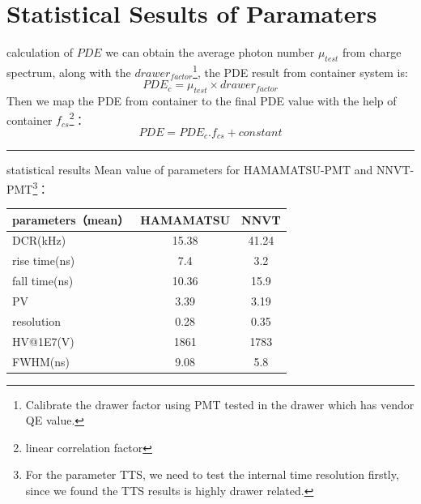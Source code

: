 \documentclass[11pt,compress,xcolor=x11names,UTF8]{beamer}
\begin{document}
\section{Statistical Sesults of Paramaters}
\begin{frame}{calculation of $PDE$}
we can obtain the average photon number $\mu_{test}$ from charge spectrum, along with the $drawer_{factor}$\footnote{Calibrate the drawer factor using PMT tested in the drawer which has vendor QE value.}, the PDE result from container system is:
\begin{equation}
PDE_{c}=\mu_{test}\times drawer_{factor}
\end{equation}
Then we map the PDE from container to the final PDE value with the help of container $f_{cs}$\footnote{linear correlation factor}：
\begin{equation}
PDE=PDE_{c}.f_{cs}+constant
\label{pde_formula}
\end{equation}
\vspace{.5cm}
\hrule{\textwidth}
\vspace{.5cm}

\end{frame}
\begin{frame}{statistical results}
Mean value of parameters for HAMAMATSU-PMT and NNVT-PMT\footnote{For the parameter TTS, we need to test the internal time resolution firstly, since we found the TTS results is highly drawer related.}：

\vspace{.5cm}

\centering
\begin{tabular}{l|c|c}
\hline
\hline
parameters（mean）&  {\color{Blue} HAMAMATSU} & {\color{Blue}NNVT} \\\hline
DCR(kHz)&15.38&41.24\\
rise time(ns)&7.4& 3.2\\
fall time(ns)&10.36& 15.9\\
PV&3.39& 3.19\\
resolution&0.28& 0.35\\
HV@1E7(V)&1861& 1783\\
FWHM(ns)&9.08& 5.8\\
\hline
\end{tabular}
\end{frame}
\end{document}
